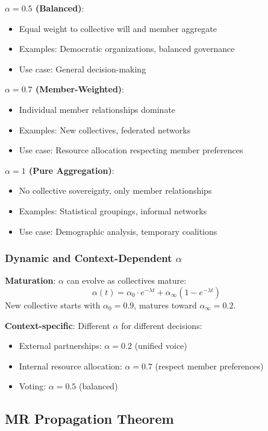\documentclass[11pt,a4paper]{article}
\theoremstyle{definition}
\theoremstyle{remark}
\begin{document}
\textbf{$\alpha = 0.5$ (Balanced)}:
\begin{itemize}
\item Equal weight to collective will and member aggregate
\item Examples: Democratic organizations, balanced governance
\item Use case: General decision-making
\end{itemize}

\textbf{$\alpha = 0.7$ (Member-Weighted)}:
\begin{itemize}
\item Individual member relationships dominate
\item Examples: New collectives, federated networks
\item Use case: Resource allocation respecting member preferences
\end{itemize}

\textbf{$\alpha = 1$ (Pure Aggregation)}:
\begin{itemize}
\item No collective sovereignty, only member relationships
\item Examples: Statistical groupings, informal networks
\item Use case: Demographic analysis, temporary coalitions
\end{itemize}

\subsubsection{Dynamic and Context-Dependent $\alpha$}

\textbf{Maturation}: $\alpha$ can evolve as collectives mature:
\[ \alpha(t) = \alpha_0 \cdot e^{-\lambda t} + \alpha_{\infty}(1 - e^{-\lambda t}) \]
New collective starts with $\alpha_0 = 0.9$, matures toward $\alpha_{\infty} = 0.2$.

\textbf{Context-specific}: Different $\alpha$ for different decisions:
\begin{itemize}
\item External partnerships: $\alpha = 0.2$ (unified voice)
\item Internal resource allocation: $\alpha = 0.7$ (respect member preferences)
\item Voting: $\alpha = 0.5$ (balanced)
\end{itemize}

\subsection{MR Propagation Theorem}
\end{document}
